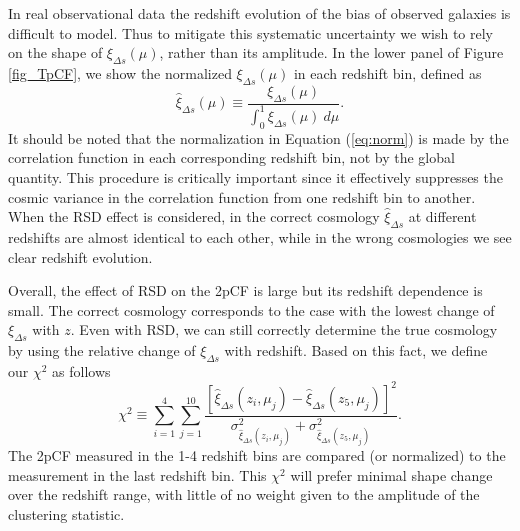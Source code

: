 \documentclass[useAMS,usenatbib]{mn2e}
\begin{document}
In real observational data the redshift evolution of the bias of observed galaxies is difficult to model.
Thus to mitigate this systematic uncertainty we wish to rely on the shape of $\xi_{\Delta s}(\mu)$, rather than its amplitude.
In the lower panel of Figure \ref{fig_TpCF}, we show the normalized $\xi_{\Delta s}(\mu)$ in each redshift bin, defined as
\begin{equation}\label{eq:norm}
 \hat\xi_{\Delta s}(\mu) \equiv \frac{\xi_{\Delta s}(\mu)}{\int_0^1\xi_{\Delta s}(\mu)\ d\mu}.
\end{equation}
It should be noted that the normalization in Equation (\ref{eq:norm}) is made by the correlation function
in each corresponding redshift bin, not by the global quantity. 
This procedure is critically important since it effectively suppresses the cosmic variance in the correlation function from one redshift bin to another.
When the RSD effect is considered,
in the correct cosmology $\hat {\xi}_{\Delta s}$ at different redshifts are almost identical to each other,
while in the wrong cosmologies we see clear redshift evolution.

Overall, the effect of RSD on the 2pCF is large but its redshift dependence is small.
The correct cosmology corresponds to the case with the lowest change of $\xi_{\Delta s}$ with $z$.
Even with RSD, we can still correctly determine the true cosmology by using the relative change of $\xi_{\Delta s}$ with redshift.
Based on this fact, we define our $\chi^2$ as follows
\begin{equation}\label{eq:chisq1}
\chi^2\equiv \sum_{i=1}^{4} \sum_{j=1}^{10} \frac{[\hat\xi_{\Delta s}(z_i,\mu_j)-\hat\xi_{\Delta s}(z_5,\mu_j)]^2}
{\sigma_{\hat\xi_{\Delta s}(z_i,\mu_j)}^2+\sigma^2_{\hat\xi_{\Delta s}(z_5,\mu_j)}}.
\end{equation}
The 2pCF measured in the 1-4 redshift bins are compared (or normalized) to the measurement in the last redshift bin.
This $\chi^2$ will prefer minimal shape change over the redshift range, with little of no weight given to the amplitude of the clustering statistic. 
\end{document}
